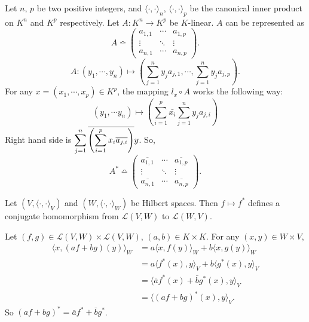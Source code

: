 \begin{exampleenv}
    Let $n$, $p$ be two positive integers, and $\langle \cdot,\cdot\rangle_{n}$, $\langle \cdot, \cdot\rangle_{p}$ be the canonical inner product on $K^n$ and $K^p$ respectively.
    Let $A:K^n \rightarrow K^p$ be $K$-linear. $A$ can be represented as
    $$ A \bumpeq  \begin{pmatrix}
        a_{1,1} & \cdots & a_{1,p}\\
        \vdots & \ddots & \vdots\\
        a_{n,1} & \cdots & a_{n,p}
    \end{pmatrix}.$$
    $$ A: (y_1, \cdots, y_n)\longmapsto \left(\sum_{j=1}^{n} y_j a_{j,1}, \cdots,\sum_{j=1}^{n}y_j a_{j,p}\right).$$
    For any $x= (x_1,\cdots,x_p)\in K^p$, the mapping $l_x\circ A$ works the following way:
    $$ (y_1,\cdots y_n) \mapsto \left(\sum_{i=1}^{p}\bar{x_i} \sum_{j=1}^{n}y_ja_{j,i}\right)$$
    Right hand side is $\displaystyle \sum_{j=1}^{n}\overline{\left(\sum_{i=1}^{p} x_i \overline{a_{j,i}}\right)}y$. So,
    $$ A^* \bumpeq \begin{pmatrix}
        \overline{a_{1,1}} & \cdots & \overline{a_{1,p}}\\
        \vdots & \ddots & \vdots\\
        \overline{a_{n,1}} & \cdots & \overline{a_{n,p}}
    \end{pmatrix}.$$
\end{exampleenv}

\begin{propositionenv}
    Let $\left(V, \langle \cdot,\cdot\rangle_{V}\right)$ and $\left(W, \langle \cdot,\cdot\rangle_{W}\right)$ be Hilbert spaces.
    Then $f\mapsto f^*$ defines a conjugate homomorphism from $\mathcal{L}(V,W)$ to $\mathcal{L}(W,V)$.
\end{propositionenv}
\begin{proofenv}
    Let $(f,g) \in \mathcal{L}(V,W)\times \mathcal{L}(V,W)$, $(a,b) \in K\times K$.
    For any $(x,y)\in W\times V$, 
    $$\begin{aligned}
        \langle x,(af+bg)(y) \rangle_{W} & =  a\langle x,f(y)\rangle_{W} + b\langle x,g(y)\rangle_{W}\\
        &= a\langle f^*(x),y\rangle_V + b\langle g^*(x),y\rangle_V \\
        &= \langle \bar{a} f^*(x) + \bar{b} g^*(x), y\rangle_V\\
        &= \langle (af+bg)^*(x), y\rangle_V.
    \end{aligned}$$
    So $(af + bg)^* = \bar{a} f^* + \bar{b} g^*$.
\end{proofenv}

